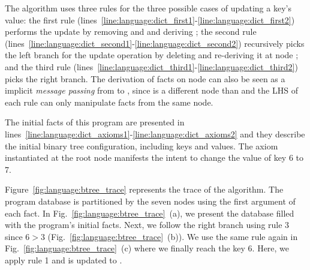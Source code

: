 The algorithm uses three rules for the three possible cases of updating a key's
value: the first rule
(lines~\ref{line:language:dict_first1}-\ref{line:language:dict_first2}) performs
the update by removing  and  and
deriving ; the second rule
(lines~\ref{line:language:dict_second1}-\ref{line:language:dict_second2})
recursively picks the left branch for the update operation by deleting
 and re-deriving it at node ; and the
third rule
(lines~\ref{line:language:dict_third1}-\ref{line:language:dict_third2}) picks
the right branch. The derivation of  facts on node  can
also be seen as a implicit \emph{message passing} from  to ,
since  is a different node than  and the LHS of each rule can
only manipulate facts from the same node.

The initial facts of this program are presented in
lines~\ref{line:language:dict_axioms1}-\ref{line:language:dict_axioms2} and they
describe the initial binary tree configuration, including keys and values.  The
axiom  instantiated at the root node 
manifests the intent to change the value of key 6 to 7.

Figure~\ref{fig:language:btree_trace} represents the trace of the algorithm. The program
database is partitioned by the seven nodes using the first argument of each
fact. In Fig.~\ref{fig:language:btree_trace}~(a), we present the database filled with the
program's initial facts. Next, we follow the right branch using rule 3 since $6
> 3$ (Fig.~\ref{fig:language:btree_trace}~(b)).  We use the same rule again in
Fig.~\ref{fig:language:btree_trace}~(c) where we finally reach the key 6. Here, we apply
rule 1 and  is updated to .

